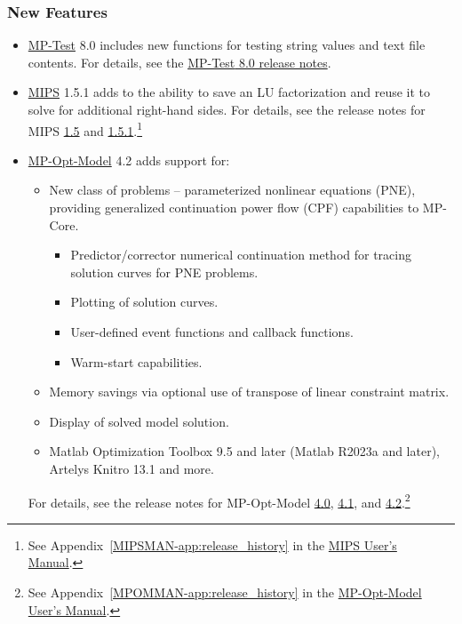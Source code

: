 \documentclass[12pt]{article}
\newcommand{\matlab}[0]{{\sc Matlab}}
\newcommand{\mptest}[0]{{MP-Test}}
\newcommand{\mptesturl}[0]{https://github.com/MATPOWER/mptest}
\newcommand{\mptestlink}[0]{\href{\mptesturl}{\mptest{}}}
\newcommand{\mips}[0]{{MIPS}}
\newcommand{\mipsurl}[0]{https://github.com/MATPOWER/mips}
\newcommand{\mipslink}[0]{\href{\mipsurl}{\mips{}}}
\newcommand{\mipsver}[0]{1.5.2}
\newcommand{\mpom}[0]{\mbox{MP-Opt-Model}}
\newcommand{\mpomurl}[0]{https://github.com/MATPOWER/mp-opt-model}
\newcommand{\mpomlink}[0]{\href{\mpomurl}{\mpom{}}}
\newcommand{\mpomver}[0]{5.0}
\newcommand{\mpcore}{{MP-Core}}
\newcommand{\code}[1]{{\relsize{-0.5}{\tt{{#1}}}}}  %
\newcommand{\mipsmanurl}[0]{https://matpower.org/docs/MIPS-manual-\mipsver.pdf}
\newcommand{\mpommanurl}[0]{https://matpower.org/docs/MP-Opt-Model-manual-\mpomver.pdf}
\newcommand{\mipsman}[0]{\href{\mipsmanurl}{\mips{} User's Manual}}
\newcommand{\mpomman}[0]{\href{\mpommanurl}{\mpom{} User's Manual}}
\numberwithin{equation}{section}
\numberwithin{table}{section}
\numberwithin{figure}{section}
\begin{document}
\begin{appendices}
\subsubsection*{New Features}
\begin{itemize}
\item \mptestlink{} 8.0 includes new functions for testing string values and text file contents. For details, see the \href{\mptesturl/blob/master/docs/relnotes/MP-Test-Release-Notes-8.0.md}{\mptest{} 8.0 release notes}.
\item \mipslink{} 1.5.1 adds to \code{mplinsolve()} the ability to save an LU factorization and reuse it to solve for additional right-hand sides. For details, see the release notes for \mips{} \href{\mipsurl/blob/master/docs/relnotes/MIPS-Release-Notes-1.5.md}{1.5} and \href{\mipsurl/blob/master/docs/relnotes/MIPS-Release-Notes-1.5.1.md}{1.5.1}.\footnote{See Appendix~\ref{MIPSMAN-app:release_history} in the \mipsman{}.}
\item \mpomlink{} 4.2 adds support for:
  \begin{itemize}
    \item New class of problems -- parameterized nonlinear equations (PNE), providing generalized continuation power flow (CPF) capabilities to \mpcore{}.
      \begin{itemize}
      \item Predictor/corrector numerical continuation method for tracing solution curves for PNE problems.
      \item Plotting of solution curves.
      \item User-defined event functions and callback functions.
      \item Warm-start capabilities.
      \end{itemize}
    \item Memory savings via optional use of transpose of linear constraint matrix.
    \item Display of solved model solution.
    \item \matlab{} Optimization Toolbox 9.5 and later (\matlab{} R2023a and later), Artelys Knitro 13.1 and more.
  \end{itemize}
 For details, see the release notes for \mpom{}  \href{\mpomurl/blob/master/docs/relnotes/MP-Opt-Model-Release-Notes-4.0.md}{4.0}, \href{\mpomurl/blob/master/docs/relnotes/MP-Opt-Model-Release-Notes-4.1.md}{4.1}, and \href{\mpomurl/blob/master/docs/relnotes/MP-Opt-Model-Release-Notes-4.2.md}{4.2}.\footnote{See Appendix~\ref{MPOMMAN-app:release_history} in the \mpomman{}.}

\end{itemize}
\end{appendices}
\end{document}
